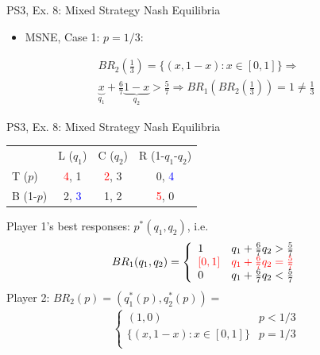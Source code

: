 \begin{frame}{PS3, Ex. 8: Mixed Strategy Nash Equilibria}
\begin{multicols}{2}
    \vspace{-8pt}
    \begin{itemize}
      \item MSNE, Case 1: $p=1/3:$
    \end{itemize}
    \vspace{-10pt}
    \begin{align*}
      BR_2\left(\frac{1}{3}\right)=\{(x,1-x):x\in[0,1]\}\Rightarrow\\
      \underbrace{x}_{q_1} + \frac{6}{7}\underbrace{1-x}_{q_2} > \frac{5}{7} \Rightarrow BR_1\left(BR_2(\frac{1}{3})\right)=1\neq\frac{1}{3}
    \end{align*}
  \vfill\null
  \end{multicols}
\end{frame}
\begin{frame}{PS3, Ex. 8: Mixed Strategy Nash Equilibria}
  \begin{multicols}{2}
    \begin{table}
      \begin{tabular}{l|c|c|c|}
          \multicolumn{1}{c}{}  & \multicolumn{1}{c}{L ($q_1$)} & \multicolumn{1}{c}{C ($q_2$)} & \multicolumn{1}{c}{R (1-$q_1$-$q_2$)} \\\cline{2-4}
          T ($p$)   & \textcolor{red}{4}, 1 & \textcolor{red}{2}, 3 & 0, \textcolor{blue}{4} \\\cline{2-4}
          B (1-$p$) & 2, \textcolor{blue}{3} & 1, 2 & \textcolor{red}{5}, 0 \\\cline{2-4}
      \end{tabular}
    \end{table}
    Player 1's best responses: $p^{*}(q_1,q_2)$, i.e.
    \begin{align*}
      BR_1(q_1,q_2)=
      \left\{ \begin{array}{ll}
          1                 & q_1 + \frac{6}{7}q_2 > \frac{5}{7}\\
          \textcolor{red}{\left[0,1\right]}  & \textcolor{red}{q_1 + \frac{6}{7}q_2 = \frac{5}{7}}\\
          0                 & q_1 + \frac{6}{7}q_2 < \frac{5}{7}
      \end{array}\right.
    \end{align*}
    Player 2: $BR_2(p)=\left(q_1^{*}(p),q_2^{*}(p)\right)=$
    \begin{align*}
      \left\{ \begin{array}{ll}
          (1,0)                 & p < 1/3 \\
          \{(x,1-x):x\in[0,1]\} & p = 1/3 \\

\end{array}
\end{align*}
\end{multicols}
\end{frame}
